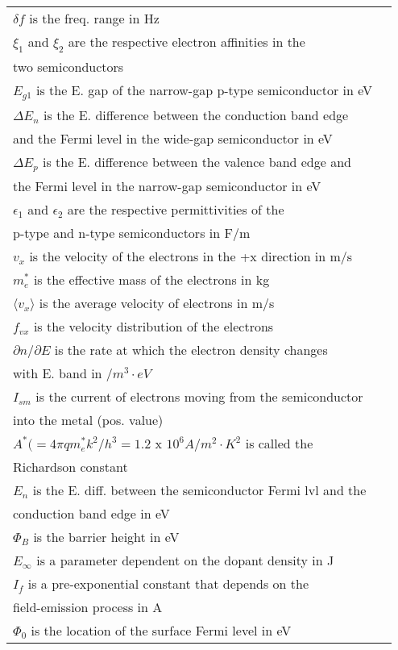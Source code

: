 \documentclass[10pt,landscape]{article}
\begin{document}
\begin{multicols}{3}
\begin{tabular}{@{}ll@{}}
$ \delta f$ is the freq. range in Hz \\
$ \xi_1$ and $\xi_2$ are the respective electron affinities in the \\
two semiconductors \\
$ E_{g1}$ is the E. gap of the narrow-gap p-type semiconductor in eV \\
$ \Delta E_n$ is the E. difference between the conduction band edge \\
and the Fermi level in the wide-gap semiconductor in eV \\
$ \Delta E_p$ is the E. difference between the valence band edge and \\
the Fermi level in the narrow-gap semiconductor in eV \\
$ \epsilon_1$ and $\epsilon_2$ are the respective permittivities of the \\
p-type and n-type semiconductors in F/m \\
$ v_x$ is the velocity of the electrons in the +x direction in m/s \\
$ m^*_e$ is the effective mass of the electrons in kg \\
$ \langle v_x\rangle$ is the average velocity of electrons in m/s \\
$ f_{vx}$ is the velocity distribution of the electrons \\
$ \partial n/\partial E$ is the rate at which the electron density changes \\
with E. band in $/m^3\cdot eV$  \\
$ I_{sm}$ is the current of electrons moving from the semiconductor \\
into the metal (pos. value)\\
$ A^* (=4\pi qm^*_ek^2/h^3=1.2$ x $10^6 A/m^2\cdot K^2$ is called the \\
Richardson constant \\
$ E_n$ is the E. diff. between the semiconductor Fermi lvl and the \\
conduction band edge in eV \\
$ \Phi_{B}$ is the barrier height in eV \\
$ E_{\infty}$ is a parameter dependent on the dopant density in J \\
$ I_f$ is a pre-exponential constant that depends on the \\
field-emission process in A \\
$ \Phi_0$ is the location of the surface Fermi level in eV \\

\end{tabular}
\end{multicols}
\end{document}
